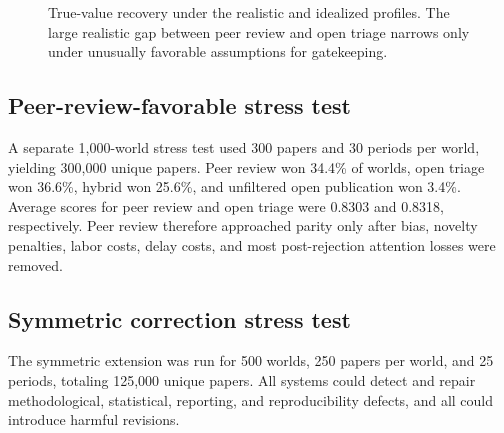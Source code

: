 \documentclass[11pt]{article}
\begin{document}
\begin{figure}[ht]
\centering
{}
\caption{True-value recovery under the realistic and idealized profiles. The large realistic gap between peer review and open triage narrows only under unusually favorable assumptions for gatekeeping.}
\label{fig:profiles_truevalue}
\end{figure}

\subsection{Peer-review-favorable stress test}

A separate 1,000-world stress test used 300 papers and 30 periods per world, yielding 300,000 unique papers. Peer review won 34.4\% of worlds, open triage won 36.6\%, hybrid won 25.6\%, and unfiltered open publication won 3.4\%. Average scores for peer review and open triage were 0.8303 and 0.8318, respectively. Peer review therefore approached parity only after bias, novelty penalties, labor costs, delay costs, and most post-rejection attention losses were removed.


\subsection{Symmetric correction stress test}

The symmetric extension was run for 500 worlds, 250 papers per world, and 25 periods, totaling 125,000 unique papers. All systems could detect and repair methodological, statistical, reporting, and reproducibility defects, and all could introduce harmful revisions.
\end{document}
